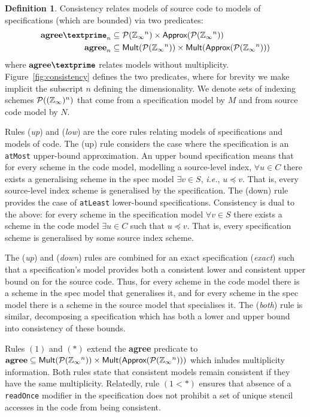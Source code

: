 \documentclass[10pt,preprint]{sigplanconf}
\newcounter{block}
\theoremstyle{definition}
\newtheorem{definition}[block]{Definition}
\newcommand{\ie}{\emph{i.e.}}
\newcommand{\term}[1]{\texttt{#1}}
\newcommand{\consName}{\textbf{agree\textprime}}
\newcommand{\consAName}{\textbf{agree}}
\begin{document}
\begin{definition}
Consistency relates models of source code to models
of specifications (which are bounded) via two predicates:
\begin{align*}
\consName_n & \subseteq \mathcal{P}(\domainVal{}^n)
\times \textsf{Approx}(\mathcal{P}(\domainVal{}^n)) \\
\consAName_n & \subseteq \textsf{Mult}(\mathcal{P}(\domainVal{}^n))
\times \textsf{Mult}(\textsf{Approx}(\mathcal{P}(\domainVal{}^n)))
\end{align*}
%
where $\consName$ relates models without multiplicity.
Figure~\ref{fig:consistency} defines the two predicates, where for
brevity we make implicit the subscript $n$ defining the
dimensionality.  We denote sets of indexing schemes
$\mathcal{P}((\mathbb{Z}_\infty{})^n)$ that come from a specification model
by $M$ and from source code model by $N$.

Rules (\emph{up}) and (\emph{low}) are the core rules relating models of
specifications and models of code. The (up) rule
considers the case where the specification is
an \term{atMost} upper-bound approximation.
An upper bound specification means that for every scheme in the code
model, modelling a source-level index, $\forall u \in C$ there exists
a generalising scheme in the spec model $\exists v \in S$, \ie{}, $u
\preceq v$. That is, every source-level index scheme is generalised by the specification.
The (down) rule provides the case of
\term{atLeast} lower-bound specifications. Consistency is dual to the above:
for every scheme in the specification model $\forall v \in S$ there
exists a scheme in the code model $\exists u \in C$ such that $u
\preceq v$. That is, every specification scheme is generalised by some source
index scheme.

The (\emph{up}) and (\emph{down}) rules are combined for an \textsf{exact}
specification (\textit{exact}) such that a specification's model
provides both a consistent lower and consistent upper bound on
for the source code. Thus, for every scheme in the code model there
is a scheme in the spec model that generalises it, and for every
scheme in the spec model there is a scheme in the source model that
specialises it.  The (\textit{both}) rule is similar, decomposing
a specification which has both a lower and upper bound into
consistency of these bounds.

Rules $(1)$ and $(*)$ extend the \consName{}
predicate to $\consAName{} \subseteq
\textsf{Mult}(\mathcal{P}(\domainVal{}^n))
\times \textsf{Mult}(\textsf{Approx}(\mathcal{P}(\domainVal{}^n)))$
which inludes multiplicity information. Both rules
state that consistent models remain consistent if they
have the same multiplicity. Relatedly, rule $(1 < *)$ ensures
that absence of a \texttt{readOnce} modifier in the specification
does not prohibit a set of unique stencil accesses in the
code from being consistent.
\end{definition}
\end{document}
